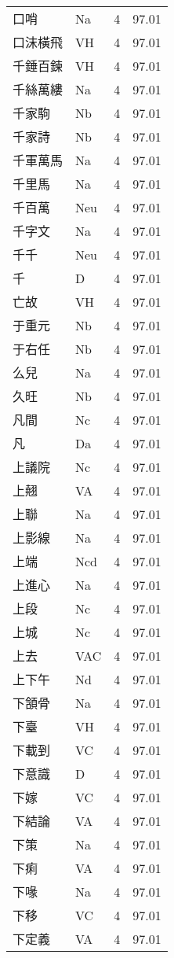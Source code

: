 \documentclass[twocolumn]{book}
\begin{document}
\begin{supertabular}{llrr}
口哨 & Na & 4 &  97.01\\
口沫橫飛 & VH & 4 &  97.01\\
千錘百鍊 & VH & 4 &  97.01\\
千絲萬縷 & Na & 4 &  97.01\\
千家駒 & Nb & 4 &  97.01\\
千家詩 & Nb & 4 &  97.01\\
千軍萬馬 & Na & 4 &  97.01\\
千里馬 & Na & 4 &  97.01\\
千百萬 & Neu & 4 &  97.01\\
千字文 & Na & 4 &  97.01\\
千千 & Neu & 4 &  97.01\\
千 & D & 4 &  97.01\\
亡故 & VH & 4 &  97.01\\
于重元 & Nb & 4 &  97.01\\
于右任 & Nb & 4 &  97.01\\
么兒 & Na & 4 &  97.01\\
久旺 & Nb & 4 &  97.01\\
凡間 & Nc & 4 &  97.01\\
凡 & Da & 4 &  97.01\\
上議院 & Nc & 4 &  97.01\\
上翹 & VA & 4 &  97.01\\
上聯 & Na & 4 &  97.01\\
上影線 & Na & 4 &  97.01\\
上端 & Ncd & 4 &  97.01\\
上進心 & Na & 4 &  97.01\\
上段 & Nc & 4 &  97.01\\
上城 & Nc & 4 &  97.01\\
上去 & VAC & 4 &  97.01\\
上下午 & Nd & 4 &  97.01\\
下頷骨 & Na & 4 &  97.01\\
下臺 & VH & 4 &  97.01\\
下載到 & VC & 4 &  97.01\\
下意識 & D & 4 &  97.01\\
下嫁 & VC & 4 &  97.01\\
下結論 & VA & 4 &  97.01\\
下策 & Na & 4 &  97.01\\
下痢 & VA & 4 &  97.01\\
下喙 & Na & 4 &  97.01\\
下移 & VC & 4 &  97.01\\
下定義 & VA & 4 &  97.01\\

\end{supertabular}
\end{document}
